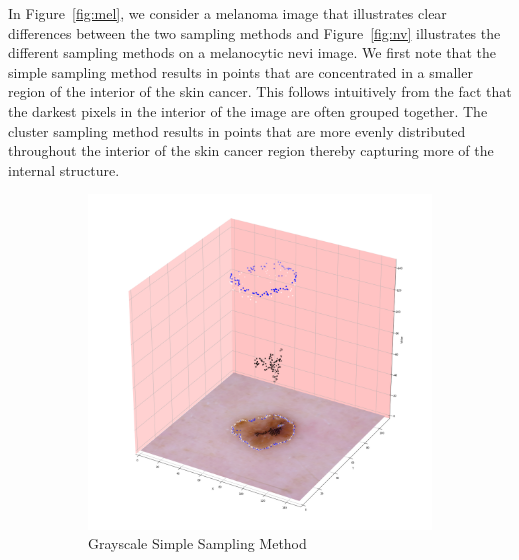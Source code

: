 \documentclass[11pt, reqno]{amsart}
\theoremstyle{plain}
\theoremstyle{definition}
\begin{document}
In Figure~\ref{fig:mel}, we consider a melanoma image that illustrates clear differences between the two sampling methods and Figure~\ref{fig:nv} illustrates the different sampling methods on a melanocytic nevi image. We first note that the simple sampling method results in points that are concentrated in a smaller region of the interior of the skin cancer. This follows intuitively from the fact that the darkest pixels in the interior of the image are often grouped together. The cluster sampling method results in points that are more evenly distributed throughout the interior of the skin cancer region thereby capturing more of the internal structure. 

\begin{figure}
\centering
\begin{subfigure}{.5\textwidth}
  \centering
  \includegraphics[width=\linewidth]{simple_mel4.png}
  \caption{Grayscale Simple Sampling Method}
\end{subfigure}%
\begin{subfigure}{.5\textwidth}
  \centering

\end{subfigure}
\end{figure}
\end{document}
